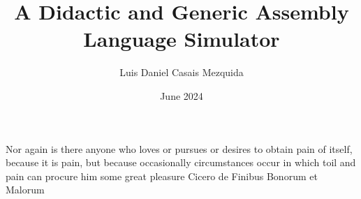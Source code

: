 \documentclass[en]{uc3mthesisIEEE}
\title{A Didactic and Generic Assembly Language Simulator}
\author{Luis Daniel Casais Mezquida}
\date{June 2024}
\begin{document}
  \makecover

  \makeepigraph
    {Nor again is there anyone who loves or pursues or desires to obtain pain of itself, because it is pain, but because occasionally circumstances occur in which toil and pain can procure him some great pleasure}  %
    {Cicero}  %
    {de Finibus Bonorum et Malorum}  %


  \begin{abstract}
    \lipsum[1-3]
  \end{abstract}


  \begin{acknowledgements}
    \lipsum[1]
  \end{acknowledgements}


  \tableofcontents
  \listoffigures
  \listoftables


  \begin{thesis}
  \end{thesis}

  \cleardoublepage
  \label{bibliography}
  \printbibliography[heading=bibintoc]

  \cleardoublepage
  \label{glossary}
	\printglossaries


\end{document}
